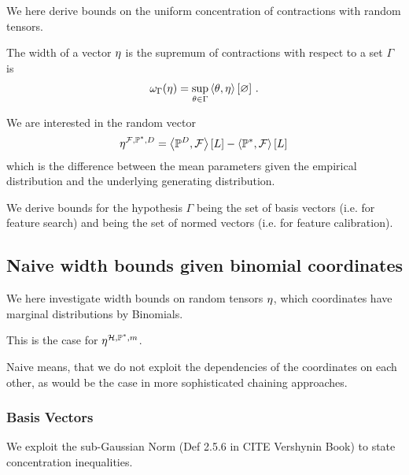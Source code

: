 


We here derive bounds on the uniform concentration of contractions with random tensors.


The width of a vector $\eta$ is the supremum of contractions with respect to a set $\Gamma$ is
\begin{align}
	\omega_{\Gamma}(\eta)
	= \sup_{\theta\in\Gamma} \left\langle \theta,\eta\right\rangle \left[ \varnothing \right] \, .
\end{align}

We are interested in the random vector
	\[ \eta^{\mathcal{F},\mathbb{P}^*,D} = \left\langle \mathbb{P}^{D},\mathcal{F}\right\rangle \left[ L \right] -  \left\langle \mathbb{P}^*,\mathcal{F}\right\rangle \left[ L \right]  \,  \]
which is the difference between the mean parameters given the empirical distribution and the underlying generating distribution.

We derive bounds for the hypothesis $\Gamma$ being the set of basis vectors (i.e. for feature search) and being the set of normed vectors (i.e. for feature calibration).

\subsection{Naive width bounds given binomial coordinates}\label{sec:directWidthBounds}

We here investigate width bounds on random tensors $\eta$, which coordinates have marginal distributions by Binomials.

This is the case for $\eta^{\mathcal{H},\mathbb{P}^*,m}$.

Naive means, that we do not exploit the dependencies of the coordinates on each other, as would be the case in more sophisticated chaining approaches.

\subsubsection{Basis Vectors}

We exploit the sub-Gaussian Norm (Def 2.5.6 in CITE Vershynin Book) to state concentration inequalities.

